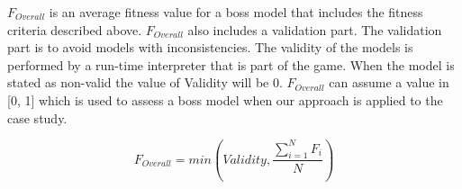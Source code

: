 $F_{Overall}$ is an average fitness value for a boss model that includes the fitness criteria described above. $F_{Overall}$ also includes a validation part. The validation part is to avoid models with inconsistencies. The validity of the models is performed by a run-time interpreter that is part of the game. When the model is stated as non-valid the value of Validity will be 0. $F_{Overall}$ can assume a value in [0, 1] which is used to assess a boss model when our \ApproachName{} approach is applied to the \CaseStudy{} case study.

\begin{equation}
F_{Overall} = min( Validity, \frac{\sum\limits_{i=1}^{N}F_{i}}{N} )
\end{equation}







